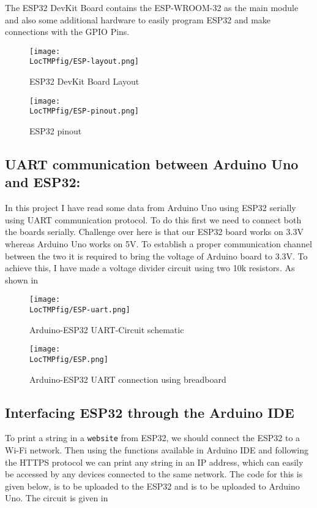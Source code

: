 The ESP32 DevKit Board contains the ESP-WROOM-32 as the main
module and also some additional hardware to easily program ESP32
and make connections with the GPIO Pins.

\begin{figure}
  \centering
  \texttt{[image: \\LocTMPfig/ESP-layout.png]}
  \caption{ESP32 DevKit Board Layout}
  \label{fig:ESPlayout}
\end{figure}

\begin{figure}
  \centering
  \texttt{[image: \\LocTMPfig/ESP-pinout.png]}
  \caption{ESP32 pinout}
  \label{fig:ESPpinout}
\end{figure}

\subsection{UART communication between Arduino Uno and ESP32:}
In this project I have read some data from Arduino Uno using
ESP32 serially using UART communication protocol. To do this
first we need to connect both the boards serially. Challenge
over here
is that our ESP32 board works on 3.3V whereas Arduino Uno works
on 5V. To establish a proper communication channel between the
two it is required to bring the voltage of Arduino board to
3.3V.
To achieve this, I have made a voltage divider circuit using two
10k resistors. As shown in 

\begin{figure}
  \centering
  \texttt{[image: \\LocTMPfig/ESP-uart.png]}
  \caption{Arduino-ESP32 UART-Circuit schematic}
  \label{fig:ard-uart}
\end{figure}

\begin{figure}
  \centering
  \texttt{[image: \\LocTMPfig/ESP.png]}
  \caption{Arduino-ESP32 UART connection using breadboard}
  \label{fig:ESP}
\end{figure}

\subsection{Interfacing ESP32 through the Arduino IDE}
To print a string in a {\tt website} from ESP32, we should
connect the ESP32 to a Wi-Fi network. Then using the functions
available in Arduino IDE and following the HTTPS protocol we can
print
any string in an IP address, which can easily be accessed by any
devices connected to the same network. The code for this is
given below,  is to be uploaded to the ESP32
and
 is to be uploaded to Arduino Uno. The circuit
is given in 

